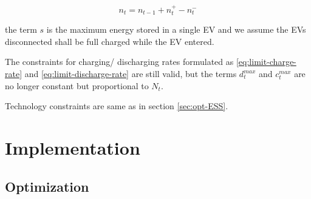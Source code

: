 \begin{equation}
\label{eq:state-EV-nb}
n_t = n_{t-1} +n_t^+ - n_t^-
\end{equation}

the term $s$ is the maximum energy stored in a single EV and we assume the EVs disconnected shall be full charged while the EV entered.

The constraints for charging/ discharging rates formulated as \eqref{eq:limit-charge-rate} and \eqref{eq:limit-discharge-rate} are still valid, but the terms $d_t^{max}$ and $c_t^{max}$ are no longer constant but proportional to $N_t$.

Technology constraints are same as in section \ref{sec:opt-ESS}.


\section{Implementation}
\label{Implementation}

\subsection{Optimization}
